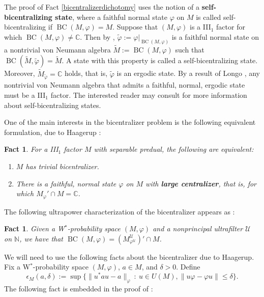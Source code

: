 \documentclass[12pt]{amsart}
\newtheorem{fact}[thm]{Fact}
\theoremstyle{definition}
\newcommand{\C}{\mathbb{C}}
\newcommand{\N}{\mathbb{N}}
\def\bb{\mathbb}
\def\bb{\mathbb}
\def\u{\mathsf 1}
\def \u{\mathcal U}
\def\BC{\operatorname{BC}}
\begin{document}
  The proof of Fact \ref{bicentralizerdichotomy} uses the notion of a \textbf{self-bicentralizing state}, where a faithful normal state $\varphi$ on $M$ is called self-bicentralizing if $\BC(M,\varphi)=M$.  Suppose that $(M,\varphi)$ is a III$_1$ factor for which $\BC(M,\varphi)\not=\bb C$.  Then by \cite[Theorem 3.5]{houdayerisono17prime}, $\tilde{\varphi}:=\varphi|_{\BC(M,\varphi)}$ is a faithful normal state on a nontrivial von Neumann algebra $\tilde{M}:=\BC(M,\varphi)$ such that
$\BC(\tilde{M},\tilde{\varphi})=\tilde{M}$. A state with this property is called a self-bicentralizing state. Moreover,  $\tilde{M}_{\tilde{\varphi}}=\C$ holds, that is, $\tilde\varphi$ is an ergodic state.  By a result of Longo \cite[Proof of Theorem 3]{longo1979notes}, any nontrivial von Neumann algebra that admits a faithful, normal, ergodic state must be a III$_1$ factor.  The interested reader may consult \cite{AHHM20,Marrakchi20} for more information about self-bicentralizing states.

One of the main interests in the bicentralizer problem is the following equivalent formulation, due to Haagerup \cite[Theorem 3.1]{haagerup87}:

\begin{fact}\label{bicentralizerlargecentralizer}
For a III$_1$ factor $M$ with separable predual, the following are equivalent:
\begin{enumerate}
    \item $M$ has trivial bicentralizer.
    \item There is a faithful, normal state $\varphi$ on $M$ with \textbf{large centralizer}, that is, for which $M_\varphi'\cap M=\bb C$.
\end{enumerate}
\end{fact}

The following ultrapower characterization of the bicentralizer appears as \cite[Proposition 3.3]{houdayerisono17prime}:

\begin{fact}\label{BCultrapower}
Given a W$^*$-probability space $(M,\varphi)$ and a nonprincipal ultrafilter $\u$ on $\N$, we have that $\BC(M,\varphi)=(M^\u_{\varphi^\u})'\cap M$.
\end{fact}

We will need to use the following facts about the bicentralizer due to Haagerup.  Fix a W$^*$-probability space $(M,\varphi)$, $a\in M$, and $\delta>0$.  Define
$$\epsilon_M(a,\delta):=\sup\{\|u^*au-a\|_\varphi \ : \ u\in U(M), \|u\varphi-\varphi u\|\leq \delta\}.$$  The following fact is embedded in the proof of \cite[Lemma 1.2]{haagerup87}:
\end{document}
